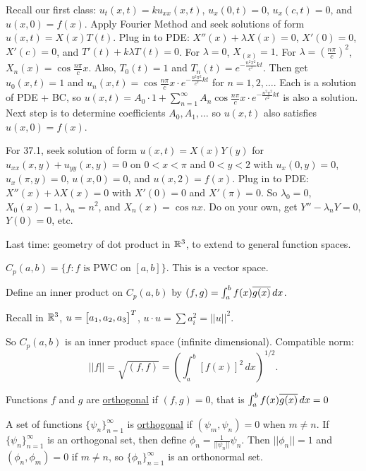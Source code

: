 \documentclass[]{article}
\begin{document}
\begin{example}
	Recall our first class: $u_t(x,t) = ku_{xx}(x,t)$, $u_x(0,t) = 0$, $u_x(c,t) = 0$, and $u(x,0) = f(x)$. Apply Fourier Method and seek solutions of form $u(x,t) = X(x)T(t)$. Plug in to PDE: $X''(x) + \lambda X(x) = 0$, $X'(0) = 0$, $X'(c) = 0$, and $T'(t) + k\lambda T(t) = 0$. For $\lambda = 0$, $X_(x) = 1$. For $\lambda = \left(\frac{n\pi}{c}\right)^2$, $X_n(x) = \cos{\frac{n\pi}{c}x}$. Also, $T_0(t) = 1$ and $T_n(t) = e^{-\frac{n^2\pi^2}{c^2}kt}$. Then get $u_0(x,t) = 1$ and $u_n(x,t) = \cos{\frac{n\pi}{c}x}\cdot e^{-\frac{n^2\pi^2}{c^2}kt}$ for $n=1,2,\dots$. Each is a solution of PDE + BC, so $u(x,t) = A_0 \cdot 1 + \sum_{n=1}^\infty A_n \cos{\frac{n\pi}{c}x} \cdot e^{-\frac{n^2\pi^2}{c^2}kt}$ is also a solution. Next step is to determine coefficients $A_0,A_1,\dots$ so $u(x,t)$ also satisfies $u(x,0) = f(x)$.
\end{example}
\begin{example}
	For 37.1, seek solution of form $u(x,t) = X(x)Y(y)$ for $u_{xx}(x,y) + u_{yy}(x,y) = 0$ on $0<x<\pi$ and $0<y<2$ with $u_x(0,y) = 0$, $u_x(\pi,y) = 0$, $u(x,0) = 0$, and $u(x,2) = f(x)$. Plug in to PDE: $X''(x) + \lambda X(x) = 0$ with $X'(0) = 0$ and $X'(\pi) = 0$. So $\lambda_0 = 0$, $X_0(x) = 1$, $\lambda_n = n^2$, and $X_n(x) = \cos{nx}$. Do on your own, get $Y'' - \lambda_n Y = 0$, $Y(0) = 0$, etc.
\end{example}
\newpage
Last time: geometry of dot product in $\mathbb{R}^3$, to extend to general function spaces.
\begin{recall}
	$C_p(a,b) = \{f:f \text{ is PWC on }[a,b]\}$. This is a vector space.
\end{recall}
\begin{definition}
	Define an inner product on $C_p(a,b)$ by $(f,g) = \int_a^b f(x) \overline{g(x)} \, dx$.
\end{definition}
\begin{recall}
	Recall in $\mathbb{R}^3$, $u = \begin{bmatrix}a_1,a_2,a_3\end{bmatrix}^T$, $u\cdot u = \sum a_i^2 = ||u||^2$.
\end{recall}
So $C_p(a,b)$ is an inner product space (infinite dimensional).
Compatible norm: $$||f|| = \sqrt{(f,f)} = \left( \int_a^b [f(x)]^2 \, dx \right)^{1/2}.$$
\begin{definition}
	Functions $f$ and $g$ are \underline{orthogonal} if $(f,g) = 0$, that is $\int_a^b f(x) \overline{g(x)} \, dx = 0$
\end{definition}
A set of functions $\{\psi_n\}_{n=1}^\infty$ is \underline{orthogonal} if $(\psi_m,\psi_n) = 0$ when $m\neq n$. If $\{\psi_n\}_{n=1}^\infty$ is an orthogonal set, then define $\phi_n = \frac{1}{||\psi_n||}\psi_n$. Then $||\phi_n|| = 1$ and $(\phi_n,\phi_m) = 0$ if $m\neq n$, so $\{\phi_n\}_{n=1}^\infty$ is an orthonormal set.
\end{document}
